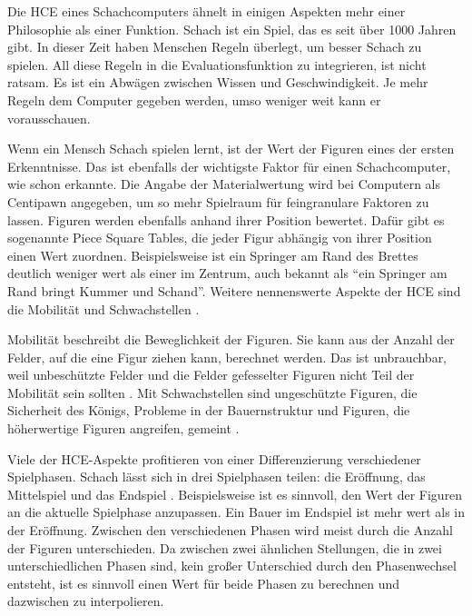 Die \ac{HCE} eines Schachcomputers ähnelt in einigen Aspekten mehr einer Philosophie als einer Funktion. Schach ist ein Spiel, das es seit über 1000 Jahren gibt. In dieser Zeit haben Menschen Regeln überlegt, um besser Schach zu spielen. All diese Regeln in die Evaluationsfunktion zu integrieren, ist nicht ratsam. Es ist ein Abwägen zwischen Wissen und Geschwindigkeit. Je mehr Regeln dem Computer gegeben werden, umso weniger weit kann er vorausschauen.

Wenn ein Mensch Schach spielen lernt, ist der Wert der Figuren eines der ersten Erkenntnisse. Das ist ebenfalls der wichtigste Faktor für einen Schachcomputer, wie schon \citeauthor{Shannon1950} \citeyear{Shannon1950} \cite{Shannon1950} erkannte. Die Angabe der Materialwertung wird bei Computern als Centipawn angegeben, um so mehr Spielraum für feingranulare Faktoren zu lassen. Figuren werden ebenfalls anhand ihrer Position bewertet. Dafür gibt es sogenannte Piece Square Tables, die jeder Figur abhängig von ihrer Position einen Wert zuordnen. Beispielsweise ist ein Springer am Rand des Brettes deutlich weniger wert als einer im Zentrum, auch bekannt als \enquote{ein Springer am Rand bringt Kummer und Schand}. Weitere nennenswerte Aspekte der \ac{HCE} sind die Mobilität und Schwachstellen \cite[S. 228]{Levy1988}.

Mobilität beschreibt die Beweglichkeit der Figuren. Sie kann aus der Anzahl der Felder, auf die eine Figur ziehen kann, berechnet werden. Das ist unbrauchbar, weil unbeschützte Felder und die Felder gefesselter Figuren nicht Teil der Mobilität sein sollten \cite[S. 228]{Levy1988}. Mit Schwachstellen sind ungeschützte Figuren, die Sicherheit des Königs, Probleme in der Bauernstruktur und Figuren, die höherwertige Figuren angreifen, gemeint \cite[S. 228]{Levy1988}.

Viele der \ac{HCE}-Aspekte profitieren von einer Differenzierung verschiedener Spielphasen. Schach lässt sich in drei Spielphasen teilen: die Eröffnung, das Mittelspiel und das Endspiel \cite[S. 8]{Levy1988}. Beispielsweise ist es sinnvoll, den Wert der Figuren an die aktuelle Spielphase anzupassen. Ein Bauer im Endspiel ist mehr wert als in der Eröffnung. Zwischen den verschiedenen Phasen wird meist durch die Anzahl der Figuren unterschieden. Da zwischen zwei ähnlichen Stellungen, die in zwei unterschiedlichen Phasen sind, kein großer Unterschied durch den Phasenwechsel entsteht, ist es sinnvoll einen Wert für beide Phasen zu berechnen und dazwischen zu interpolieren.

